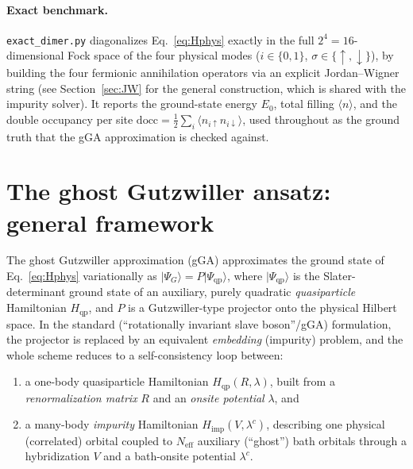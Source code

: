 \documentclass[11pt]{article}
\newcommand{\Neff}{N_{\mathrm{eff}}}
\newcommand{\Hqp}{H_{\mathrm{qp}}}
\newcommand{\Himp}{H_{\mathrm{imp}}}
\begin{document}
\paragraph{Exact benchmark.} \texttt{exact\_dimer.py} diagonalizes
Eq.~\eqref{eq:Hphys} exactly in the full $2^4=16$-dimensional Fock space of the
four physical modes ($i\in\{0,1\}$, $\sigma\in\{\uparrow,\downarrow\}$), by
building the four fermionic annihilation operators via an explicit
Jordan--Wigner string (see Section~\ref{sec:JW} for the general construction,
which is shared with the impurity solver). It reports the ground-state energy
$E_0$, total filling $\langle n\rangle$, and the double occupancy per site
$\mathrm{docc}=\tfrac12\sum_i\langle n_{i\uparrow}n_{i\downarrow}\rangle$, used
throughout as the ground truth that the gGA approximation is checked against.

\section{The ghost Gutzwiller ansatz: general framework}
\label{sec:gga-general}

The ghost Gutzwiller approximation (gGA) approximates the ground state of
Eq.~\eqref{eq:Hphys} variationally as $|\Psi_G\rangle = P|\Psi_{\mathrm{qp}}\rangle$,
where $|\Psi_{\mathrm{qp}}\rangle$ is the Slater-determinant ground state of an
auxiliary, purely quadratic \emph{quasiparticle} Hamiltonian $\Hqp$, and $P$ is a
Gutzwiller-type projector onto the physical Hilbert space. In the standard
(``rotationally invariant slave boson''/gGA) formulation, the projector is
replaced by an equivalent \emph{embedding} (impurity) problem, and the whole
scheme reduces to a self-consistency loop between:
\begin{enumerate}
  \item a one-body quasiparticle Hamiltonian $\Hqp(R,\lambda)$, built from a
    \emph{renormalization matrix} $R$ and an \emph{onsite potential} $\lambda$,
    and
  \item a many-body \emph{impurity} Hamiltonian $\Himp(V,\lambda^c)$, describing
    one physical (correlated) orbital coupled to $\Neff$ auxiliary
    (``ghost'') bath orbitals through a hybridization $V$ and a bath-onsite
    potential $\lambda^c$.
\end{enumerate}
\end{document}
